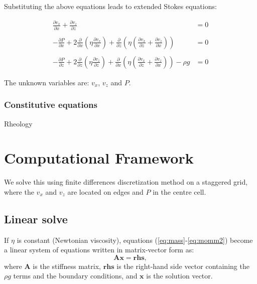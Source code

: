 \documentclass[a4paper,11pt]{article}
\begin{document}
Substituting the above equations leads to extended Stokes equations:

\begin{align}
\frac{\displaystyle \partial v_x}{\displaystyle \partial x}+\frac{\displaystyle \partial v_z}{\displaystyle \partial z} &= 0  \label{eq:mass}\\
& \nonumber \\ 
-\frac{\displaystyle \partial P}{\displaystyle \partial x}+2\frac{\displaystyle \partial}{\displaystyle \partial x}\left(\eta\frac{\displaystyle \partial v_x}{\displaystyle \partial x}\right)+\frac{\displaystyle \partial}{\displaystyle \partial z}\left(\eta\left(\frac{\displaystyle \partial v_x}{\displaystyle \partial z}+\frac{\displaystyle \partial v_z}{\displaystyle \partial x}\right)\right) &= 0  \label{eq:momm1}\\
&\nonumber  \\
-\frac{\displaystyle \partial P}{\displaystyle \partial z}+2\frac{\displaystyle \partial}{\displaystyle \partial z}\left(\eta\frac{\displaystyle \partial v_z}{\displaystyle \partial z}\right)+\frac{\displaystyle \partial}{\displaystyle \partial x}\left(\eta\left(\frac{\displaystyle \partial v_x}{\displaystyle \partial z}+\frac{\displaystyle \partial v_z}{\displaystyle \partial x}\right)\right) - \rho g &= 0  \label{eq:momm2}
\end{align}

The unknown variables are: $v_x$, $v_z$ and $P$. 

\subsubsection{Constitutive equations}
Rheology 

\section{Computational Framework}

We solve this using finite differences discretization method on a staggered grid, where the $v_x$ and $v_z$ are located on edges and $P$ in the centre cell.

\subsection{Linear solve}
If $\eta$ is constant (Newtonian viscosity), equations (\ref{eq:mass}-\ref{eq:momm2}) become a linear system of equations written in matrix-vector form as:
\begin{equation}
\textbf{A} \textbf{x} = \textbf{rhs},
\end{equation}
where $\textbf{A}$ is the stiffness matrix, $\textbf{rhs}$ is the right-hand side vector containing the $\rho g$ terms and the boundary conditions, and $\textbf{x} $ is the solution vector. 
\end{document}

